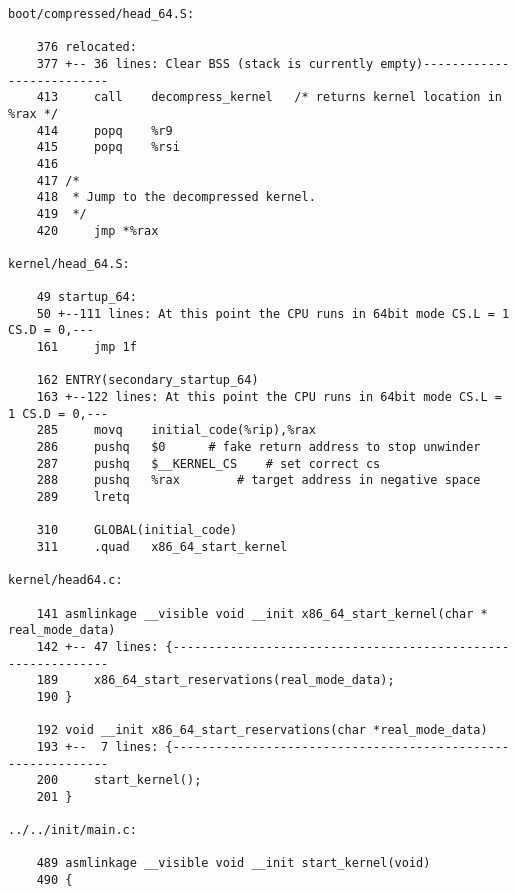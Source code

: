 \begin{framed}
\begin{verbatim}
boot/compressed/head_64.S:

    376 relocated:
    377 +-- 36 lines: Clear BSS (stack is currently empty)--------------------------
    413     call    decompress_kernel   /* returns kernel location in %rax */
    414     popq    %r9
    415     popq    %rsi
    416 
    417 /*
    418  * Jump to the decompressed kernel.
    419  */
    420     jmp *%rax

kernel/head_64.S:

    49 startup_64:
    50 +--111 lines: At this point the CPU runs in 64bit mode CS.L = 1 CS.D = 0,---
    161     jmp 1f

    162 ENTRY(secondary_startup_64)
    163 +--122 lines: At this point the CPU runs in 64bit mode CS.L = 1 CS.D = 0,---
    285     movq    initial_code(%rip),%rax
    286     pushq   $0      # fake return address to stop unwinder
    287     pushq   $__KERNEL_CS    # set correct cs
    288     pushq   %rax        # target address in negative space
    289     lretq

    310     GLOBAL(initial_code)
    311     .quad   x86_64_start_kernel

kernel/head64.c:

    141 asmlinkage __visible void __init x86_64_start_kernel(char * real_mode_data)
    142 +-- 47 lines: {-------------------------------------------------------------
    189     x86_64_start_reservations(real_mode_data);
    190 }

    192 void __init x86_64_start_reservations(char *real_mode_data)
    193 +--  7 lines: {-------------------------------------------------------------
    200     start_kernel();
    201 }

../../init/main.c:

    489 asmlinkage __visible void __init start_kernel(void)
    490 {

\end{verbatim}\end{framed}

